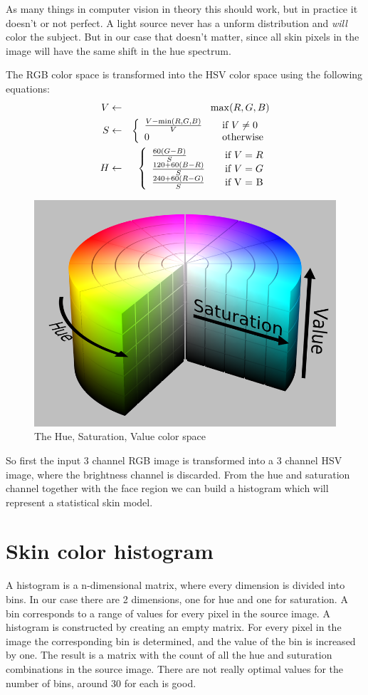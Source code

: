 As many things in computer vision in theory this should work, but in practice it doesn't or not perfect. A light source never has a unform distribution and \emph{will} color the subject. But in our case that doesn't matter, since all skin pixels in the image will have the same shift in the hue spectrum.

The RGB color space is transformed into the HSV color space using the following equations:
\begin{eqnarray*}
  V & \leftarrow & \max(R,G,B) \\
  S & \leftarrow & \left\{
  \begin{array}{l l}
    \frac{V-\min(R, G, B)}{V} & \quad \text{if $V \neq 0$} \\
    0 						  & \quad \text{otherwise} \\
  \end{array} \right.\\
  H & \leftarrow & \left\{
  \begin{array}{l l}
    \frac{60(G - B)}{S}     & \quad \text{if $V = R$} \\
    \frac{120 + 60(B-R)}{S} & \quad \text{if $V = G$} \\
    \frac{240 + 60(R-G)}{S} & \quad \text{if V = B} \\
  \end{array} \right.\\
\end{eqnarray*}

\begin{figure}[htbp]
	\center
	\includegraphics[width=0.4\linewidth]{figures/hsv.png}
	\caption{The Hue, Saturation, Value color space}
	\label{fig:hsv}
\end{figure}

So first the input 3 channel RGB image is transformed into a 3 channel HSV image, where the brightness channel is discarded. From the hue and saturation channel together with the face region we can build a histogram which will represent a statistical skin model.


\section{Skin color histogram}
A histogram is a n-dimensional matrix, where every dimension is divided into bins. In our case there are 2 dimensions, one for hue and one for saturation. A bin corresponds to a range of values for every pixel in the source image. A histogram is constructed by creating an empty matrix. For every pixel in the image the corresponding bin is determined, and the value of the bin is increased by one. The result is a matrix with the count of all the hue and suturation combinations in the source image. There are not really optimal values for the number of bins, around 30 for each is good.

